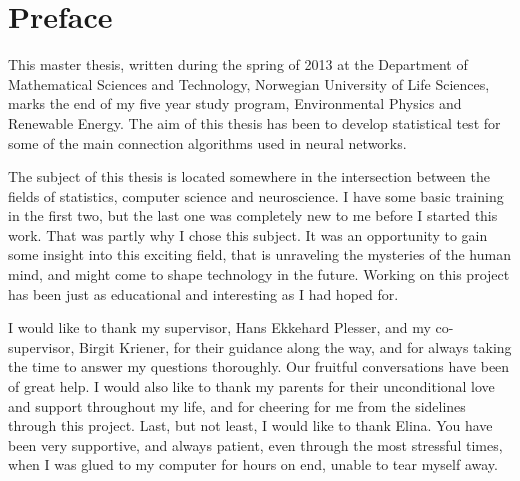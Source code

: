 \chapter{Preface}


This master thesis, written during the spring of 2013 at the Department of Mathematical Sciences and Technology, Norwegian University of Life Sciences, marks the end of my five year study program, Environmental Physics and Renewable Energy. 
The aim of this thesis has been to develop statistical test for some of the main connection algorithms used in neural networks. 

The subject of this thesis is located somewhere in the intersection between the fields of statistics, computer science and neuroscience. I have some basic training in the first two, but the last one was completely new to me before I started this work. That was partly why I chose this subject. It was an opportunity to gain some insight into this exciting field, that is unraveling the mysteries of the human mind, and might come to shape technology in the future. Working on this project has been just as educational and interesting as I had hoped for. 

I would like to thank my supervisor, Hans Ekkehard Plesser, and my co-supervisor, Birgit Kriener, for their guidance along the way, and for always taking the time to answer my questions thoroughly. Our fruitful conversations have been of great help.
I would also like to thank my parents for their unconditional love and support throughout my life, and for cheering for me from the sidelines through this project. Last, but not least, I would like to thank Elina. You have been very supportive, and always patient, even through the most stressful times, when I was glued to my computer for hours on end, unable to tear myself away.


\clearchapter

